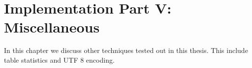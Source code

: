 \chapter{Implementation Part V: Miscellaneous}
\label{chp:misc}
In this chapter we discuss other techniques tested out in this thesis. This include table statistics and UTF 8 encoding.
